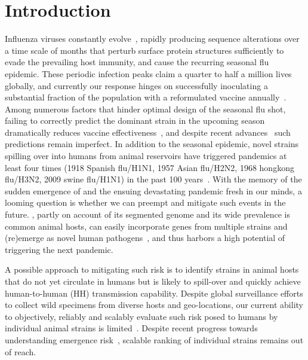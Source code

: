 \documentclass[onecolumn, compsoc,10pt]{IEEEtran}
\begin{document}
\vspace{10pt}
\section*{Introduction}
Influenza viruses constantly evolve~\cite{dos2016influenza},  rapidly producing  sequence alterations over a time scale of months  that  perturb surface protein structures sufficiently to evade the prevailing host immunity, and cause the  recurring seasonal flu epidemic. These periodic  infection peaks claim a quarter to half a million lives~\cite{huddleston2020integrating} globally,  and currently our response hinges on  successfully inoculating a substantial fraction of the  population with a  reformulated  vaccine annually~\cite{boni2008vaccination,dos2016influenza}.  Among numerous factors that hinder optimal design of the seasonal flu shot, failing to correctly predict the dominant strain in the upcoming season dramatically reduces vaccine effectiveness~\cite{tricco2013comparing}, and despite  recent advances~\cite{neher2014predicting,huddleston2020integrating} such predictions remain imperfect. In addition to  the seasonal  epidemic, novel \infl strains spilling over into humans from animal reservoirs have triggered  pandemics  at least four times (1918 Spanish flu/H1N1, 1957 Asian flu/H2N2, 1968 hongkong flu/H3N2, 2009 swine flu/H1N1) in the past 100 years~\cite{shao2017evolution}. With the memory of the  sudden emergence of \cov and the ensuing devastating pandemic fresh in our minds, a looming question  is whether we can  preempt and mitigate such events in the future.  \infl,  partly on account of its segmented genome and its wide prevalence is common animal hosts, can easily incorporate genes from multiple strains and (re)emerge as novel human pathogens~\cite{reid2003origin,vergara2014ns}, and   thus harbors  a high potential  of triggering the next  pandemic.



A possible approach to mitigating such risk is to identify  strains in animal hosts that do not yet circulate in humans but is likely to spill-over and quickly achieve human-to-human (HH) transmission capability. Despite global surveillance efforts to  collect wild specimens from diverse hosts and geo-locations, our  current ability to objectively, reliably and scalably  evaluate such risk posed to  humans by  individual animal  strains  is  limited~\cite{wille2021accurately}. Despite recent progress towards understanding emergence risk~\cite{pulliam2009ability,grewelle2020larger,grange2021ranking}, scalable ranking of individual strains remains out of reach.
\end{document}

